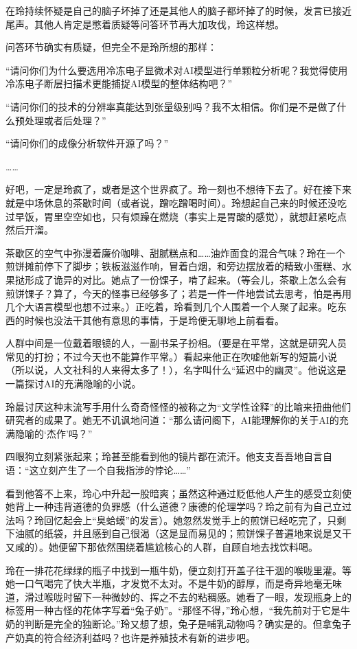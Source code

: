 在玲持续怀疑是自己的脑子坏掉了还是其他人的脑子都坏掉了的时候，发言已接近尾声。其他人肯定是憋着质疑等问答环节再大加攻伐，玲这样想。

问答环节确实有质疑，但完全不是玲所想的那样：

“请问你们为什么要选用冷冻电子显微术对AI模型进行单颗粒分析呢？我觉得使用冷冻电子断层扫描术更能捕捉AI模型的整体结构吧？”

“请问你们的技术的分辨率真能达到张量级别吗？我不太相信。你们是不是做了什么预处理或者后处理？”

“请问你们的成像分析软件开源了吗？”

……

好吧，一定是玲疯了，或者是这个世界疯了。玲一刻也不想待下去了。好在接下来就是中场休息的茶歇时间（或者说，蹭吃蹭喝时间）。玲想起自己来的时候还没吃过早饭，胃里空空如也，只有烦躁在燃烧（事实上是胃酸的感觉），就想赶紧吃点然后开溜。

茶歇区的空气中弥漫着廉价咖啡、甜腻糕点和……油炸面食的混合气味？玲在一个煎饼摊前停下了脚步；铁板滋滋作响，冒着白烟，和旁边摆放着的精致小蛋糕、水果挞形成了诡异的对比。她点了一份馃子，啃了起来。（等会儿，茶歇上怎么会有煎饼馃子？算了，今天的怪事已经够多了；若是一件一件地尝试去思考，怕是再用几个大语言模型也想不过来。）正吃着，玲看到几个人围着一个人聚了起来。吃东西的时候也没法干其他有意思的事情，于是玲便无聊地上前看看。

人群中间是一位戴着眼镜的人，一副书呆子扮相。（要是在平常，这就是研究人员常见的打扮；不过今天也不能算作平常。）看起来他正在吹嘘他新写的短篇小说（所以说，人文社科的人来得太多了！），名字叫什么“延迟中的幽灵”。他说这是一篇探讨AI的充满隐喻的小说。

玲最讨厌这种末流写手用什么奇奇怪怪的被称之为“文学性诠释”的比喻来扭曲他们研究者的成果了。她无不讥讽地问道：“那么请问阁下，AI能理解你的关于AI的充满隐喻的‘杰作’吗？”

四眼狗立刻紧张起来；玲甚至能看到他的镜片都在流汗。他支支吾吾地自言自语：“这立刻产生了一个自我指涉的悖论……”

看到他答不上来，玲心中升起一股暗爽；虽然这种通过贬低他人产生的感受立刻使她背上一种违背道德的负罪感（什么道德？康德的伦理学吗？玲之前有为自己立过法吗？玲回忆起会上“臭蛤蟆”的发言）。她忽然发觉手上的煎饼已经吃完了，只剩下油腻的纸袋，并且感到自己很渴（这是显而易见的；煎饼馃子普遍地来说是又干又咸的）。她便留下那依然围绕着尴尬核心的人群，自顾自地去找饮料喝。

玲在一排花花绿绿的瓶子中找到一瓶牛奶，便立刻打开盖子往干涸的喉咙里灌。等她一口气喝完了快大半瓶，才发觉不太对。不是牛奶的醇厚，而是奇异地毫无味道，滑过喉咙时留下一种微妙的、挥之不去的粘稠感。她看了一眼，发现瓶身上的标签用一种古怪的花体字写着“兔子奶”。“那怪不得，”玲心想，“我先前对于它是牛奶的判断是完全的独断论。”玲又想了想，兔子是哺乳动物吗？确实是的。但拿兔子产奶真的符合经济利益吗？也许是养殖技术有新的进步吧。

